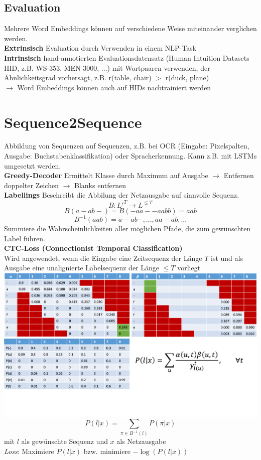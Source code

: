 \documentclass[12pt]{article}
\begin{document}
	\subsection{Evaluation}
	Mehrere Word Embeddings können auf verschiedene Weise miteinander verglichen werden.\\
	\textbf{Extrinsisch} Evaluation durch Verwenden in einem NLP-Task\\
	\textbf{Intrinsisch} hand-annotierten Evaluationsdatensatz (Human Intuition Datasets HID, z.B. WS-353, MEN-3000, ...) mit Wortpaaren verwenden, der Ähnlichkeitsgrad vorhersagt, z.B. r(table, chair) $>$ r(duck, plane)\\
	$\rightarrow$ Word Embeddings können auch auf HIDs nachtrainiert werden


	\section{Sequence2Sequence}
	Abbildung von Sequenzen auf Sequenzen, z.B. bei OCR (Eingabe: Pixelspalten, Ausgabe: Buchstabenklassifikation) oder Spracherkennung. Kann z.B. mit LSTMs umgesetzt werden.\\
	\textbf{Greedy-Decoder} Ermittelt Klasse durch Maximum auf Ausgabe $\rightarrow$ Entfernen doppelter Zeichen $\rightarrow$ Blanks entfernen\\
	\textbf{Labellings} Beschreibt die Abbilung der Netzausgabe auf sinnvolle Sequenz.
	$$B: L'^{T} \rightarrow L^{\leq T}$$
	$$B(a-ab-) = B(-aa--aabb) = aab$$
	$$B^{-1}(aab) = {a-ab-, ..., aa-ab, ...}$$
	Summiere die Wahrscheinlichkeiten aller möglichen Pfade, die zum gewünschten Label führen.\\
	\textbf{CTC-Loss (Connectionist Temporal Classification)}\\
	Wird angewendet, wenn die Eingabe eine Zeitsequenz der Länge $T$ ist und als Ausgabe eine unalignierte Labelsequenz der Länge $\leq T$ vorliegt\\
	\includegraphics[width=\linewidth]{figures/ctc-algorithmus.png}
	$$P(l|x) = \sum_{\pi \in B^{-1}(l)} P(\pi|x)$$
	mit $l$ als gewünschte Sequenz und $x$ als Netzausgabe\\
	\textit{Loss}: Maximiere $P(l|x)$ bzw. minimiere $-\log(P(l|x))$\\

\end{document}
